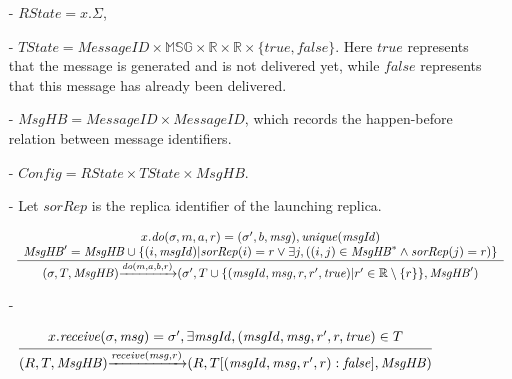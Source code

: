 \begin{itemize}
\setlength{\itemsep}{0.5pt}
\item[-] $\mathit{RState} = x.\Sigma$, 

\item[-] $\mathit{TState} = \mathit{MessageID} \times \mathbb{MSG} \times \mathbb{R} \times \mathbb{R} \times \{ \mathit{true},\mathit{false} \}$. Here $\mathit{true}$ represents that the message is generated and is not delivered yet, while $\mathit{false}$ represents that this message has already been delivered. 

\item[-] $\mathit{MsgHB} = \mathit{MessageID} \times \mathit{MessageID}$, which records the happen-before relation between message identifiers. 

\item[-] $\mathit{Config} = \mathit{RState} \times \mathit{TState} \times \mathit{MsgHB}$. 

\item[-] Let $\mathit{sorRep}$ is the replica identifier of the launching replica. 

$\begin{array}{l c}
   \bigfrac{
   \begin{array}{c}
     x.\mathit{do}(\sigma,m,a,r) = (\sigma',b,\mathit{msg}), \mathit{unique}(\mathit{msgId})\\
     \mathit{MsgHB}' = \mathit{MsgHB} \cup \{ (i,\mathit{msgId}) \vert \mathit{sorRep}(i) = r \vee \exists j, ( (i,j) \in \mathit{MsgHB}^* \wedge \mathit{sorRep}(j) = r) \}  
   \end{array}}
     {(\sigma,T,\mathit{MsgHB}) {\xrightarrow{\mathit{do}(m,a,b,r)}} (\sigma',T \cup \{ (\mathit{msgId},\mathit{msg},r,r',\mathit{true}) \vert r' \in \mathbb{R} \setminus \{ r \} \},\mathit{MsgHB}')}
\end{array}$ 

\item[-] 

$\begin{array}{l c}
   \bigfrac{
   \begin{array}{c}
      x.\mathit{receive}(\sigma,\mathit{msg}) = \sigma',\exists \mathit{msgId},(\mathit{msgId},\mathit{msg},r',r,\mathit{true}) \in T 
   \end{array}}
     {(R,T,\mathit{MsgHB}) {\xrightarrow{\mathit{receive}(\mathit{msg},r)}} (R,T[(\mathit{msgId},\mathit{msg},r',r):\mathit{false}],\mathit{MsgHB})}
\end{array}$ 
\end{itemize}


